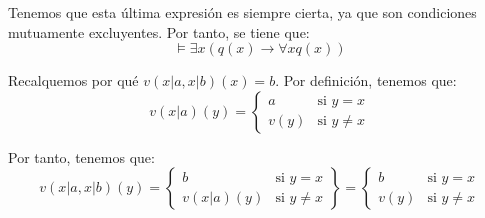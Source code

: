\begin{ejercicio}
\begin{enumerate}
        Tenemos que esta última expresión es siempre cierta, ya que son condiciones mutuamente excluyentes. Por tanto, se tiene que:
        \[\vDash \exists x(q(x)\rightarrow \forall x q(x))\]
        \begin{observacion}
            Recalquemos por qué $v(x|a,x|b)(x)=b$. Por definición, tenemos que:
            \begin{equation*}
                v(x|a)(y)=\begin{cases}
                    a & \text{si } y=x\\
                    v(y) & \text{si } y\neq x
                \end{cases}
            \end{equation*}

            Por tanto, tenemos que:
            \begin{equation*}
                v(x|a,x|b)(y)=\left\{\begin{array}{ll}
                    b & \text{si } y=x\\
                    v(x|a)(y) & \text{si } y\neq x
                \end{array}\right\}
                = \left\{\begin{array}{ll}
                    b & \text{si } y=x\\
                    v(y) & \text{si } y\neq x
                \end{array}\right.
            \end{equation*}
        \end{observacion}
    \end{enumerate}
\end{ejercicio}